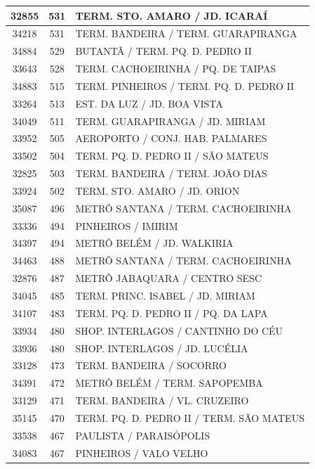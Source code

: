 \documentclass[
	12pt,				%
	oneside,			%
	a4paper,			%
	english,			%
	brazil				%
	]{abntex2ppgsi}
\begin{document}
\begin{apendicesenv}
\begin{longtable}{c|c|p{7cm}}
\hline
    32855 & 531   & TERM. STO. AMARO / JD. ICARAÍ \\
\hline
    34218 & 531   & TERM. BANDEIRA / TERM. GUARAPIRANGA \\
\hline
    34884 & 529   & BUTANTÃ / TERM. PQ. D. PEDRO II \\
\hline
    33643 & 528   & TERM. CACHOEIRINHA / PQ. DE TAIPAS \\
\hline
    34883 & 515   & TERM. PINHEIROS / TERM. PQ. D. PEDRO II \\
\hline
    33264 & 513   & EST. DA LUZ / JD. BOA VISTA \\
\hline
    34049 & 511   & TERM. GUARAPIRANGA / JD. MIRIAM \\
\hline
    33952 & 505   & AEROPORTO / CONJ. HAB. PALMARES \\
\hline
    33502 & 504   & TERM. PQ. D. PEDRO II / SÃO MATEUS \\
\hline
    32825 & 503   & TERM. BANDEIRA / TERM. JOÃO DIAS \\
\hline
    33924 & 502   & TERM. STO. AMARO / JD. ORION \\
\hline
    35087 & 496   & METRÔ SANTANA / TERM. CACHOEIRINHA \\
\hline
    33336 & 494   & PINHEIROS / IMIRIM \\
\hline
    34397 & 494   & METRÔ BELÉM / JD. WALKIRIA \\
\hline
    34463 & 488   & METRÔ SANTANA / TERM. CACHOEIRINHA \\
\hline
    32876 & 487   & METRÔ JABAQUARA / CENTRO SESC \\
\hline
    34045 & 485   & TERM. PRINC. ISABEL / JD. MIRIAM \\
\hline
    34107 & 483   & TERM. PQ. D. PEDRO II / PQ. DA LAPA \\
\hline
    33934 & 480   & SHOP. INTERLAGOS / CANTINHO DO CÉU \\
\hline
    33936 & 480   & SHOP. INTERLAGOS / JD. LUCÉLIA \\
\hline
    33128 & 473   & TERM. BANDEIRA / SOCORRO \\
\hline
    34391 & 472   & METRÔ BELÉM / TERM. SAPOPEMBA \\
\hline
    33129 & 471   & TERM. BANDEIRA / VL. CRUZEIRO \\
\hline
    35145 & 470   & TERM. PQ. D. PEDRO II / TERM. SÃO MATEUS \\
\hline
    33538 & 467   & PAULISTA / PARAISÓPOLIS \\
\hline
    34083 & 467   & PINHEIROS / VALO VELHO \\

\end{longtable}
\end{apendicesenv}
\end{document}
